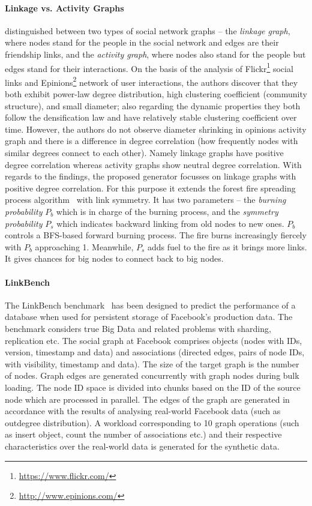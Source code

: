\paragraph{Linkage vs. Activity Graphs} \cite{Yao2011} distinguished between two
types of social network graphs -- the \emph{linkage graph}, where nodes stand
for the people in the social network and edges are their friendship links, and
the \emph{activity graph}, where nodes also stand for the people but edges stand
for their interactions. On the basis of the analysis of
Flickr\footnote{\url{https://www.flickr.com/}} social links and
Epinions\footnote{\url{http://www.epinions.com/}} network of user interactions,
the authors discover that they both exhibit power-law degree distribution, high
clustering coefficient (community structure), and small diameter; also regarding
the dynamic properties they both follow the densification law and have relatively stable
clustering coefficient over time. However, the authors do not observe diameter
shrinking in opinions activity graph and there is a difference in degree
correlation (how frequently nodes with similar degrees connect to each other).
Namely linkage graphs have positive degree correlation whereas activity graphs
show neutral degree correlation. With regards to the findings, the proposed generator focusses on linkage graphs
with positive degree correlation. For this purpose it extends the forest
fire spreading process algorithm~\cite{Leskovec:2005:GOT:1081870.1081893} with
link symmetry. It has two parameters -- the \emph{burning probability} $P_b$
which is in charge of the burning process, and the \emph{symmetry probability}
$P_s$ which indicates backward linking from old nodes to new ones. $P_b$
controls a BFS-based forward burning process. The fire burns increasingly
fiercely with $P_b$ approaching 1. Meanwhile, $P_s$ adds fuel to the fire as it
brings more links. It gives chances for big nodes to connect back to big nodes.


\paragraph{LinkBench} The LinkBench
benchmark~\cite{Armstrong:2013:LDB:2463676.2465296} has been designed to predict the
performance of a database when used for persistent storage of Facebook's
production data. The benchmark considers true Big Data and related problems with
sharding, replication etc. The social graph at Facebook comprises objects (nodes
with IDs, version, timestamp and data) and associations (directed edges, pairs
of node IDs, with visibility, timestamp and data). The size of the target graph
is the number of nodes. Graph edges are generated concurrently with graph nodes
during bulk loading. The node ID space is divided into chunks based on the ID of
the source node which  are processed in parallel. The edges of the graph are
generated in accordance with the results of analysing  real-world Facebook data
(such as outdegree distribution). A workload corresponding to 10 graph
operations (such as insert object, count the number of associations etc.) and
their respective characteristics over the real-world data is generated for the
synthetic data.

